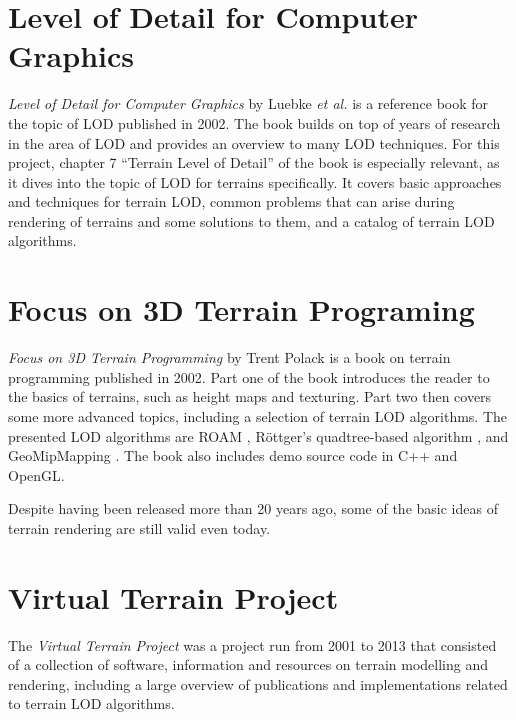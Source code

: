 \section{Level of Detail for Computer Graphics}
\textit{Level of Detail for Computer Graphics} by Luebke \textit{et al.} \cite{lodfor3dgraphics} 
is a reference book for the topic of 
LOD published in 2002. The book builds on top of years of research in the 
area of LOD and provides an overview to many LOD techniques. For this project,
chapter 7 ``Terrain Level of Detail'' of the book is especially relevant, 
as it dives into the topic of LOD for terrains specifically.
It covers basic approaches and techniques for terrain LOD, 
common problems that can arise during rendering of terrains and some solutions to them, 
and a catalog of terrain LOD algorithms.

\section{Focus on 3D Terrain Programing}
\textit{Focus on 3D Terrain Programming} by Trent Polack \cite{focuson3dterrainprogramming} is a book on terrain programming published in 2002.
Part one of the book introduces the reader to the basics of terrains, such as height maps and texturing. Part two then 
covers some more advanced topics, including a selection of terrain LOD algorithms. The presented LOD algorithms are
ROAM \cite{roam}, Röttger's quadtree-based algorithm \cite{rottgerpaper}, and GeoMipMapping \cite{geomipmapping}.
The book also includes demo source code in C++ and OpenGL.

Despite having been released more than 20 years ago, some of the basic ideas of terrain rendering are still valid even today.

\section{Virtual Terrain Project}
The \textit{Virtual Terrain Project} \cite{vtp} was a project run from 2001 to 2013 
that consisted of a collection of software, information and resources on terrain modelling and rendering,
including a large overview of publications and implementations related to terrain LOD algorithms.
